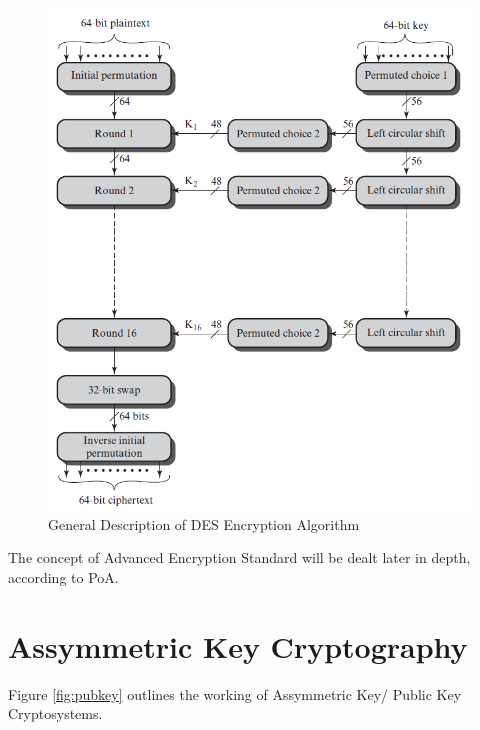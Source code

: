 \documentclass{article}
\begin{document}
\begin{figure}[!h]
    \centering
    \includegraphics[width=\textwidth]{des.png}
    \caption{General Description of DES Encryption Algorithm \cite{des}}
    \label{fig:des}
\end{figure}

The concept of Advanced Encryption Standard will be dealt later in depth, according to PoA.

\section{Assymmetric Key Cryptography}
Figure \ref{fig:pubkey} outlines the working of Assymmetric Key/ Public Key Cryptosystems.
\end{document}
